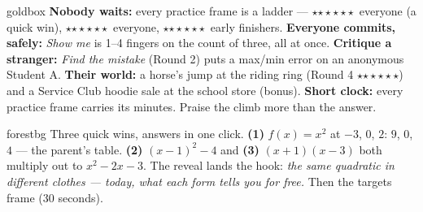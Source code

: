 \documentclass[10pt]{article}
\newcommand{\rung}[1]{{\color{goldacc}\ifcase#1\or$\star$\or$\star\star$\or$\star\star\star$\fi}}
\begin{document}
\begin{skillbox}{goldbox}
\textbf{Nobody waits:} every practice frame is a ladder --- \rung1\ everyone (a quick win),
\rung2\ everyone, \rung3\ early finishers. \textbf{Everyone commits, safely:} \emph{Show me} is
1--4 fingers on the count of three, all at once. \textbf{Critique a stranger:} \emph{Find the
mistake} (Round 2) puts a max/min error on an anonymous Student A. \textbf{Their world:} a
horse's jump at the riding ring (Round 4 \rung3) and a Service Club hoodie sale at the school
store (bonus). \textbf{Short clock:} every practice frame carries its minutes. Praise the
climb more than the answer.
\end{skillbox}

\begin{skillbox}{forestbg}
Three quick wins, answers in one click. \textbf{(1)} $f(x)=x^2$ at $-3$, $0$, $2$: $9$, $0$,
$4$ --- the parent's table. \textbf{(2)} $(x-1)^2-4$ and \textbf{(3)} $(x+1)(x-3)$ both
multiply out to $x^2-2x-3$. The reveal lands the hook: \emph{the same quadratic in different
clothes --- today, what each form tells you for free.} Then the targets frame (30 seconds).
\end{skillbox}
\end{document}
